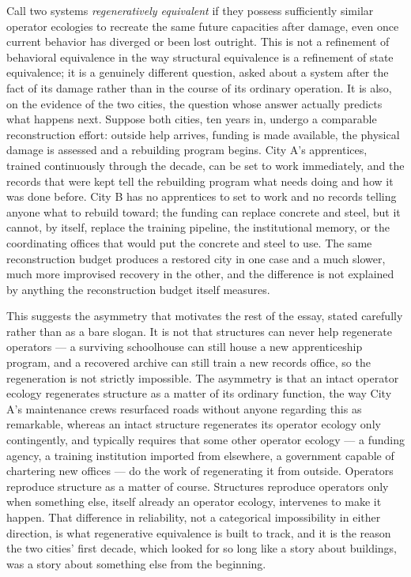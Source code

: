 \documentclass[11pt]{article}
\begin{document}
Call two systems \emph{regeneratively equivalent} if they possess
sufficiently similar operator ecologies to recreate the same future
capacities after damage, even once current behavior has diverged or
been lost outright. This is not a refinement of behavioral
equivalence in the way structural equivalence is a refinement of
state equivalence; it is a genuinely different question, asked about
a system after the fact of its damage rather than in the course of
its ordinary operation. It is also, on the evidence of the two
cities, the question whose answer actually predicts what happens
next. Suppose both cities, ten years in, undergo a comparable
reconstruction effort: outside help arrives, funding is made
available, the physical damage is assessed and a rebuilding program
begins. City A's apprentices, trained continuously through the decade,
can be set to work immediately, and the records that were kept tell
the rebuilding program what needs doing and how it was done before.
City B has no apprentices to set to work and no records telling
anyone what to rebuild toward; the funding can replace concrete and
steel, but it cannot, by itself, replace the training pipeline, the
institutional memory, or the coordinating offices that would put the
concrete and steel to use. The same reconstruction budget produces a
restored city in one case and a much slower, much more improvised
recovery in the other, and the difference is not explained by
anything the reconstruction budget itself measures.

This suggests the asymmetry that motivates the rest of the essay,
stated carefully rather than as a bare slogan. It is not that
structures can never help regenerate operators --- a surviving
schoolhouse can still house a new apprenticeship program, and a
recovered archive can still train a new records office, so the
regeneration is not strictly impossible. The asymmetry is that an
intact operator ecology regenerates structure as a matter of its
ordinary function, the way City A's maintenance crews resurfaced
roads without anyone regarding this as remarkable, whereas an intact
structure regenerates its operator ecology only contingently, and
typically requires that some other operator ecology --- a funding
agency, a training institution imported from elsewhere, a
government capable of chartering new offices --- do the work of
regenerating it from outside. Operators reproduce structure as a
matter of course. Structures reproduce operators only when something
else, itself already an operator ecology, intervenes to make it
happen. That difference in reliability, not a categorical impossibility
in either direction, is what regenerative equivalence is built to
track, and it is the reason the two cities' first decade, which
looked for so long like a story about buildings, was a story about
something else from the beginning.
\end{document}
